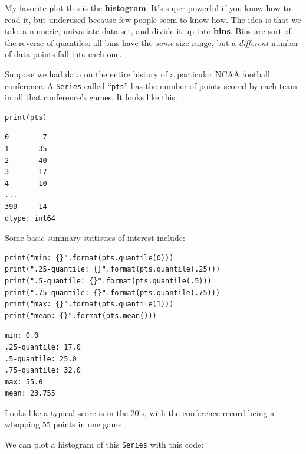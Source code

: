 
My favorite plot this is the \textbf{histogram}. It's super powerful if you
know how to read it, but underused because few people seem to know how. The
idea is that we take a numeric, univariate data set, and divide it up into
\textbf{bins}. Bins are sort of the reverse of quantiles: all bins have the
\textit{same} size range, but a \textit{different} number of data points fall
into each one.


Suppose we had data on the entire history of a particular NCAA football
conference. A \texttt{Series} called ``\texttt{pts}'' has the number of points
scored by each team in all that conference's games. It looks like this:

\begin{Verbatim}[fontsize=\small,samepage=true,frame=single,framesep=3mm]
print(pts)
\end{Verbatim}
\vspace{-.2in}

\begin{Verbatim}[fontsize=\small,samepage=true,frame=leftline,framesep=5mm,framerule=1mm]
0        7
1       35
2       40
3       17
4       10
...
399     14
dtype: int64
\end{Verbatim}

Some basic summary statistics of interest include:

\begin{Verbatim}[fontsize=\small,samepage=true,frame=single,framesep=3mm]
print("min: {}".format(pts.quantile(0)))
print(".25-quantile: {}".format(pts.quantile(.25)))
print(".5-quantile: {}".format(pts.quantile(.5)))
print(".75-quantile: {}".format(pts.quantile(.75)))
print("max: {}".format(pts.quantile(1)))
print("mean: {}".format(pts.mean()))
\end{Verbatim}
\vspace{-.2in}

\begin{Verbatim}[fontsize=\small,samepage=true,frame=leftline,framesep=5mm,framerule=1mm]
min: 0.0
.25-quantile: 17.0
.5-quantile: 25.0
.75-quantile: 32.0
max: 55.0
mean: 23.755
\end{Verbatim}

Looks like a typical score is in the 20's, with the conference record being a
whopping 55 points in one game.

We can plot a histogram of this \texttt{Series} with this code:

